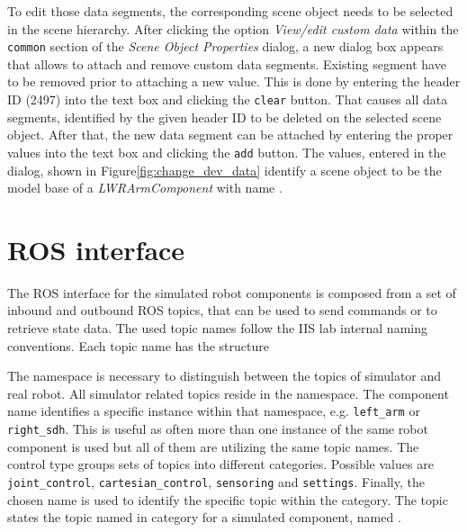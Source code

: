 To edit those data segments, the corresponding scene object needs to be selected in the scene hierarchy. After clicking the option \emph{View/edit custom data} within the \texttt{common} section of the \emph{Scene Object Properties} dialog, a new dialog box appears that allows to attach and remove custom data segments. Existing segment have to be removed prior to attaching a new value. This is done by entering the header ID (2497) into the text box and clicking the \texttt{clear} button. That causes all data segments, identified by the given header ID to be deleted on the selected scene object. After that, the new data segment can be attached by entering the proper values into the text box and clicking the \texttt{add} button. The values, entered in the dialog, shown in Figure\ref{fig:change_dev_data} identify a scene object to be the model base of a \emph{LWRArmComponent} with name .

\section{ROS interface}

The ROS interface for the simulated robot components is composed from a set of inbound and outbound ROS topics, that can be used to send commands or to retrieve state data. The used topic names follow the IIS lab internal naming conventions. Each topic name has the structure
\begin{center}
\end{center}

The namespace is necessary to distinguish between the topics of simulator and real robot. All simulator related topics reside in the  namespace. The component name identifies a specific instance within that namespace, e.g. \texttt{left\_arm} or \texttt{right\_sdh}. This is useful as often more than one instance of the same robot component is used but all of them are utilizing the same topic names. The control type groups sets of topics into different categories. Possible values are \texttt{joint\_control}, \texttt{cartesian\_control}, \texttt{sensoring} and \texttt{settings}. Finally, the chosen name is used to identify the specific topic within the category. The topic  states the topic named  in category  for a simulated component, named . \\

